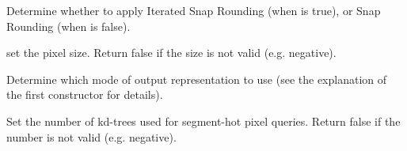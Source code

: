 {Determine whether to apply Iterated Snap Rounding (when  is true),
or Snap Rounding (when  is false).}

{set the pixel size.
Return false if the size is not valid (e.g. negative). }

{Determine which mode of output representation to use (see the explanation of
the first constructor for details).}

{Set the number of kd-trees used for segment-hot pixel queries.
Return false if the number is not valid (e.g. negative). }



